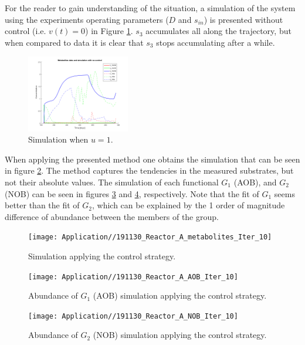 \documentclass[3p,times]{elsarticle}
\begin{document}
For the reader to gain understanding of the situation, a simulation of the system using the experiments operating parameters ($D$ and $s_{in}$) is presented without control (i.e. $v(t)= 0$) in  Figure \ref{NoControlSimulation}. $s_3$ accumulates all along the trajectory, but when compared to data it is clear that $s_3$ stops accumulating after a while. 

\begin{figure}[h]
	\centering
	\includegraphics[width= 0.4\textwidth]{Prediction_No_Control_metabolites}
	\caption{Simulation when $u=1$. }
	\label{NoControlSimulation}
\end{figure}

When applying the presented method one obtains the simulation that can be seen in figure \ref{ControlSimulation}. The method captures the tendencies in the measured substrates, but not their absolute values. The simulation of each functional $G_1$ (AOB), and $G_2$ (NOB) can be seen in figures \ref{AOBSimulation} and \ref{NOB Simulation}, respectively. Note that the fit of $G_1$ seems better than the fit of $G_2$, which can be explained by the 1 order of magnitude difference of abundance between the members of the group.


\begin{figure}[h]
	\centering
	\texttt{[image: Application//191130\_Reactor\_A\_metabolites\_Iter\_10]}
	\caption{Simulation applying the control strategy.}
	\label{ControlSimulation}
\end{figure}


\begin{figure}[h]
	\centering
	\texttt{[image: Application//191130\_Reactor\_A\_AOB\_Iter\_10]}
	\caption{Abundance of $G_1$ (AOB) simulation applying the control strategy.}
	\label{AOBSimulation}
\end{figure}

\begin{figure}[h]
	\centering
	\texttt{[image: Application//191130\_Reactor\_A\_NOB\_Iter\_10]}
	\caption{Abundance of $G_2$ (NOB) simulation applying the control strategy.}
	\label{NOB Simulation}
\end{figure}
\end{document}
